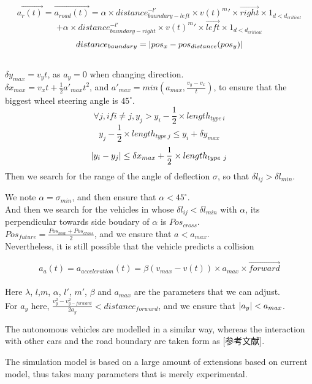 \documentclass{mcmthesis}
\begin{document}
$$\overrightarrow{a_r(t)}=\overrightarrow{a_{road}(t)}=\alpha \times distance_{baundary-left}^{-l'} \times v(t)^m'\times \overrightarrow{right} \times 1_{d<d_{critical}}$$
$$+\alpha \times distance_{baundary-right}^{-l'} \times v(t)^m'\times \overrightarrow{left} \times 1_{d<d_{critical}}$$
$$distance_{baundary}=\arrowvert pos_x-pos_{distance}(pos_y) \arrowvert$$\\
 $\delta y_{max}=v_yt$, as $a_y=0$ when changing direction.\\
$\delta x_{max}=v_xt+\frac{1}{2}a'_{max}t^2$, and $a'_{max}=min(a_{max},\frac{v_y-v_x}{t})$, to ensure that the biggest wheel steering angle is $45^{\circ}$.\\
$$\forall j, if i \ne j, y_j>y_i-\frac{1}{2} \times length_{type\ i}$$
$$y_j-\frac{1}{2} \times length_{type\ j} \le y_i+\delta y_{max}$$
$$\arrowvert y_i-y_j \arrowvert \le \delta x_{max}+ \frac{1}{2} \times length_{type\ j}$$
Then we search for the range of the angle of deflection $\sigma$, so that $\delta l_{ij}>\delta l_{min}$.

We note $\alpha=\sigma_{min}$, and then ensure that $\alpha<45^{\circ}$.\\
And then we search for the vehicles in  whose $\delta l_{ij}<\delta l_{min}$ with $\alpha$, its perpendicular towards side boudary of $\alpha$ is $Pos_{cross}$.\\

$Pos_{future}=\frac{Pos_{now}+Pos_{cross}}{2}$, and we ensure that $a<a_{max}$.\\

Nevertheless, it is still possible that the vehicle predicts a collision 

$$a_a(t)=a_{acceleration}(t)=\beta (v_{max}-v(t)) \times a_{max} \times \overrightarrow{forward}$$\\
Here $\lambda$, $l$,$m$, $\alpha$, $l'$, $m'$, $\beta$ and $a_{max}$ are the parameters that we can adjust.\\
For $a_y$ here, $ \frac{v_y^2-v_{y-forward}^2}{2a_{y}}<distance_{forward}$, and we ensure that $\arrowvert a_y \arrowvert<a_{max}$.

The autonomous vehicles are modelled in a similar way, whereas the interaction with other cars and the road boundary are taken form as [参考文献]. 

The simulation model is based on a large amount of extensions based on current model, thus takes many parameters that is merely experimental.
\end{document}
